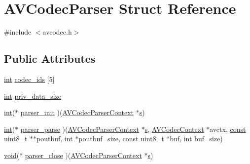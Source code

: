 \hypertarget{struct_a_v_codec_parser}{}\section{A\+V\+Codec\+Parser Struct Reference}
\label{struct_a_v_codec_parser}


{\ttfamily \#include $<$avcodec.\+h$>$}

\subsection*{Public Attributes}
\begin{DoxyCompactItemize}
\item 
\hyperlink{xmltok_8h_a5a0d4a5641ce434f1d23533f2b2e6653}{int} \hyperlink{struct_a_v_codec_parser_a283585b212b3fe90f5872119d7c604b2}{codec\+\_\+ids} \mbox{[}5\mbox{]}
\item 
\hyperlink{xmltok_8h_a5a0d4a5641ce434f1d23533f2b2e6653}{int} \hyperlink{struct_a_v_codec_parser_a33c342399b903fe66ee3560003346ce1}{priv\+\_\+data\+\_\+size}
\item 
\hyperlink{xmltok_8h_a5a0d4a5641ce434f1d23533f2b2e6653}{int}($\ast$ \hyperlink{struct_a_v_codec_parser_a5ab163d5b9fa3f1901e96809acd7ed20}{parser\+\_\+init} )(\hyperlink{struct_a_v_codec_parser_context}{A\+V\+Codec\+Parser\+Context} $\ast$\hyperlink{lib_2expat_8h_a755339d27872b13735c2cab829e47157}{s})
\item 
\hyperlink{xmltok_8h_a5a0d4a5641ce434f1d23533f2b2e6653}{int}($\ast$ \hyperlink{struct_a_v_codec_parser_a5699fb20c9a821c827a74322ccd529ef}{parser\+\_\+parse} )(\hyperlink{struct_a_v_codec_parser_context}{A\+V\+Codec\+Parser\+Context} $\ast$\hyperlink{lib_2expat_8h_a755339d27872b13735c2cab829e47157}{s}, \hyperlink{struct_a_v_codec_context}{A\+V\+Codec\+Context} $\ast$avctx, \hyperlink{getopt1_8c_a2c212835823e3c54a8ab6d95c652660e}{const} \hyperlink{lib-src_2ffmpeg_2win32_2stdint_8h_a9a941819355e6f658991890ff66b4b0e}{uint8\+\_\+t} $\ast$$\ast$poutbuf, \hyperlink{xmltok_8h_a5a0d4a5641ce434f1d23533f2b2e6653}{int} $\ast$poutbuf\+\_\+size, \hyperlink{getopt1_8c_a2c212835823e3c54a8ab6d95c652660e}{const} \hyperlink{lib-src_2ffmpeg_2win32_2stdint_8h_a9a941819355e6f658991890ff66b4b0e}{uint8\+\_\+t} $\ast$\hyperlink{xlstr_8c_a781718f5b53a876fe91c424c4607fa8f}{buf}, \hyperlink{xmltok_8h_a5a0d4a5641ce434f1d23533f2b2e6653}{int} buf\+\_\+size)
\item 
\hyperlink{sound_8c_ae35f5844602719cf66324f4de2a658b3}{void}($\ast$ \hyperlink{struct_a_v_codec_parser_a52ff1b3d42b0fc2e9c7982212f8e6c29}{parser\+\_\+close} )(\hyperlink{struct_a_v_codec_parser_context}{A\+V\+Codec\+Parser\+Context} $\ast$\hyperlink{lib_2expat_8h_a755339d27872b13735c2cab829e47157}{s})
$$
\end{DoxyCompactItemize}
